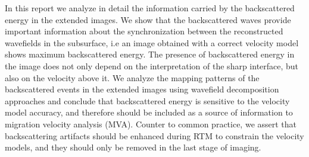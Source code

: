 In this report we analyze in detail the information carried by the backscattered energy in the extended
 images. We show that the backscattered waves provide important information about the 
synchronization between the reconstructed wavefields in the subsurface, i.e an image obtained with a correct velocity model shows maximum backscattered
energy. The presence of backscattered energy in the image does not only depend on the interpretation
of the sharp interface, but also on the velocity above it. We analyze the mapping patterns of the backscattered
events in the extended images using wavefield decomposition approaches and conclude that backscattered energy
is sensitive to the velocity model accuracy, and therefore should be included as a source
of information to migration velocity analysis (MVA). Counter to common practice, we assert that
backscattering artifacts should be enhanced during RTM to constrain the velocity models,
and they should only be removed in the last stage of imaging.



 



